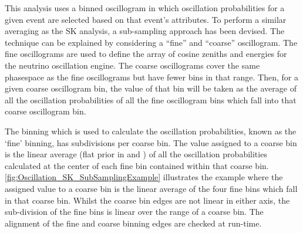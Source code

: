 This analysis uses a binned oscillogram in which oscillation probabilities for a given event are selected based on that event's attributes. To perform a similar averaging as the SK analysis, a sub-sampling approach has been devised. The technique can be explained by considering a ``fine'' and ``coarse'' oscillogram. The fine oscillograms are used to define the array of cosine zeniths and energies for the neutrino oscillation engine. The coarse oscillograms cover the same phasespace as the fine oscillograms but have fewer bins in that range. Then, for a given coarse oscillogram bin, the value of that bin will be taken as the average of all the oscillation probabilities of all the fine oscillogram bins which fall into that coarse oscillogram bin.

The binning which is used to calculate the oscillation probabilities, known as the `fine' binning, has  subdivisions per coarse bin. The value assigned to a coarse bin is the linear average (flat prior in  and ) of all the oscillation probabilities calculated at the center of each fine bin contained within that coarse bin. \autoref{fig:Oscillation_SK_SubSamplingExample} illustrates the  example where the assigned value to a coarse bin is the linear average of the four fine bins which fall in that coarse bin. Whilst the coarse bin edges are not linear in either axis, the sub-division of the fine bins is linear over the range of a coarse bin. The alignment of the fine and coarse binning edges are checked at run-time.
